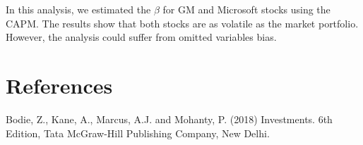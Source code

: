 \documentclass[
]{article}
\begin{document}
In this analysis, we estimated the \(\beta\) for GM and Microsoft stocks
using the CAPM. The results show that both stocks are as volatile as the
market portfolio. However, the analysis could suffer from omitted
variables bias.

\hypertarget{references}{%
\section{References}\label{references}}

Bodie, Z., Kane, A., Marcus, A.J. and Mohanty, P. (2018) Investments.
6th Edition, Tata McGraw-Hill Publishing Company, New Delhi.
\end{document}
